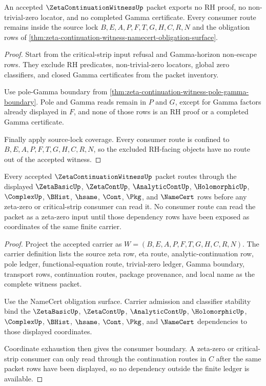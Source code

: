 \begin{theorem}
\label{thm:zeta-continuation-witness-no-rh-nonescape}
An accepted $\ZetaContinuationWitnessUp$ packet exports no RH proof, no non-trivial-zero locator, and no completed Gamma certificate. Every consumer route remains inside the source lock $B,E,A,P,F,T,G,H,C,R,N$ and the obligation rows of \autoref{thm:zeta-continuation-witness-namecert-obligation-surface}.
\end{theorem}
\begin{proof}
Start from the critical-strip input refusal and Gamma-horizon non-escape rows. They exclude RH predicates, non-trivial-zero locators, global zero classifiers, and closed Gamma certificates from the packet inventory.

Use pole-Gamma boundary from \autoref{thm:zeta-continuation-witness-pole-gamma-boundary}. Pole and Gamma reads remain in $P$ and $G$, except for Gamma factors already displayed in $F$, and none of those rows is an RH proof or a completed Gamma certificate.

Finally apply source-lock coverage. Every consumer route is confined to $B,E,A,P,F,T,G,H,C,R,N$, so the excluded RH-facing objects have no route out of the accepted witness.
\end{proof}

\begin{theorem}
\label{thm:zeta-continuation-witness-dependency-ledger}
Every accepted $\ZetaContinuationWitnessUp$ packet routes through the displayed $\ZetaBasicUp$, $\ZetaContUp$, $\AnalyticContUp$, $\HolomorphicUp$, $\ComplexUp$, $\BHist$, $\hsame$, $\Cont$, $\Pkg$, and $\NameCert$ rows before any zeta-zero or critical-strip consumer can read it. No consumer route can read the packet as a zeta-zero input until those dependency rows have been exposed as coordinates of the same finite carrier.
\end{theorem}
\begin{proof}
Project the accepted carrier as $W=(B,E,A,P,F,T,G,H,C,R,N)$. The carrier definition lists the source zeta row, eta route, analytic-continuation row, pole ledger, functional-equation route, trivial-zero ledger, Gamma boundary, transport rows, continuation routes, package provenance, and local name as the complete witness packet.

Use the NameCert obligation surface. Carrier admission and classifier stability bind the $\ZetaBasicUp$, $\ZetaContUp$, $\AnalyticContUp$, $\HolomorphicUp$, $\ComplexUp$, $\BHist$, $\hsame$, $\Cont$, $\Pkg$, and $\NameCert$ dependencies to those displayed coordinates.

Coordinate exhaustion then gives the consumer boundary. A zeta-zero or critical-strip consumer can only read through the continuation routes in $C$ after the same packet rows have been displayed, so no dependency outside the finite ledger is available.
\end{proof}

